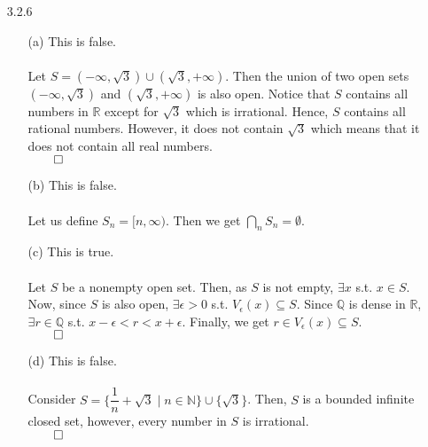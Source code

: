 \documentclass[11pt]{article}
\newcommand{\nats}{\mathbb{N}}
\newcommand{\reals}{\mathbb{R}}
\newcommand{\rats}{\mathbb{Q}}
\begin{document}
\begin{itemize}
    \newpage

    \item[3.2.6]
        \begin{itemize}
            \item[(a)]
                This is false.
                \\
                \\
                Let $S = (-\infty, \sqrt{3}) \cup (\sqrt{3}, +\infty)$. Then
                the union of two open sets $(-\infty, \sqrt{3})$ and
                $(\sqrt{3}, +\infty)$ is also open. Notice that $S$ contains
                all numbers in $\reals$ except for $\sqrt{3}$ which is
                irrational. Hence, $S$ contains all rational numbers. However,
                it does not contain $\sqrt{3}$ which means that it does not
                contain all real numbers.\\
                $\qed$

            \item[(b)]
                This is false.
                \\
                \\
                Let us define $S_n = [n, \infty)$. Then we get
                $\bigcap_n S_n = \emptyset$.

            \item[(c)]
                This is true.
                \\
                \\
                Let $S$ be a nonempty open set. Then, as $S$ is not empty,
                $\exists x$ s.t. $x \in S$. Now, since $S$ is also open,
                $\exists \epsilon > 0$ s.t. $V_\epsilon(x) \subseteq S$. Since
                $\rats$ is dense in $\reals$, $\exists r \in \rats$ s.t.
                $x - \epsilon < r < x + \epsilon$. Finally, we get
                $r \in V_\epsilon(x) \subseteq S$.\\
                $\qed$

            \item[(d)]
                This is false.
                \\
                \\
                Consider $S = \{\dfrac{1}{n} + \sqrt{3} \mid n \in \nats \}
                \cup \{\sqrt{3}\}$. Then, $S$ is a bounded infinite closed
                set, however, every number in $S$ is irrational.\\
                $\qed$


\end{itemize}
\end{itemize}
\end{document}
